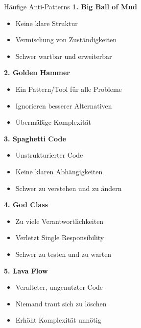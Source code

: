 \begin{concept}{Häufige Anti-Patterns}
\textbf{1. Big Ball of Mud}
\begin{itemize}
    \item Keine klare Struktur
    \item Vermischung von Zuständigkeiten
    \item Schwer wartbar und erweiterbar
\end{itemize}

\textbf{2. Golden Hammer}
\begin{itemize}
    \item Ein Pattern/Tool für alle Probleme
    \item Ignorieren besserer Alternativen
    \item Übermäßige Komplexität
\end{itemize}

\textbf{3. Spaghetti Code}
\begin{itemize}
    \item Unstrukturierter Code
    \item Keine klaren Abhängigkeiten
    \item Schwer zu verstehen und zu ändern
\end{itemize}

\textbf{4. God Class}
\begin{itemize}
    \item Zu viele Verantwortlichkeiten
    \item Verletzt Single Responsibility
    \item Schwer zu testen und zu warten
\end{itemize}

\textbf{5. Lava Flow}
\begin{itemize}
    \item Veralteter, ungenutzter Code
    \item Niemand traut sich zu löschen
    \item Erhöht Komplexität unnötig
\end{itemize}
\end{concept}

